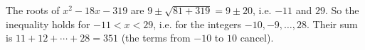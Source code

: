 The roots of $x^2-18x-319$ are $9\pm\sqrt{81+319}=9\pm20$, i.e. $-11$ and $29$. So the inequality holds for $-11<x<29$, i.e. for the integers $-10,-9,\dots,28$. Their sum is $11+12+\cdots+28=\boxed{351}$ (the terms from $-10$ to $10$ cancel).
